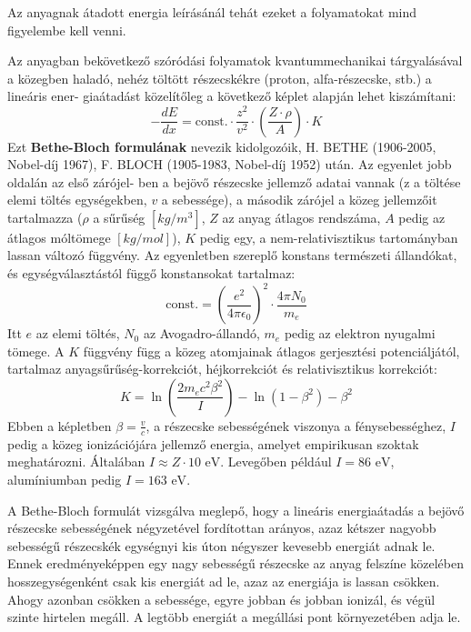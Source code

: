 \documentclass[../main.tex]{subfiles}
\begin{document}
Az anyagnak átadott energia leírásánál tehát ezeket a folyamatokat mind figyelembe
kell venni.

Az anyagban bekövetkező szóródási folyamatok kvantummechanikai tárgyalásával a
közegben haladó, nehéz töltött részecskékre (proton, alfa-részecske, stb.) a lineáris ener-
giaátadást közelítőleg a következő képlet alapján lehet kiszámítani:
\begin{equation}
    \boxed{-\frac{dE}{dx} = \text{const.} \cdot \frac{z^2}{v^2} \cdot \left(\frac{Z \cdot \rho}{A}\right) \cdot K}
\end{equation}
Ezt \textbf{Bethe-Bloch formulának} nevezik kidolgozóik, H. BETHE (1906-2005, Nobel-díj 1967),
F. BLOCH (1905-1983, Nobel-díj 1952) után. Az egyenlet jobb oldalán az első zárójel-
ben a bejövő részecske jellemző adatai vannak (z a töltése elemi töltés egységekben, $v$
a sebessége), a második zárójel a közeg jellemzőit tartalmazza ($\rho$ a sűrűség $[kg/m^3]$, $Z$ az
anyag átlagos rendszáma, $A$ pedig az átlagos móltömege
$[ kg/mol ]$), $K$ pedig egy, a nem-relativisztikus tartományban lassan változó függvény. Az egyenletben szereplő konstans
természeti állandókat, és egységválasztástól függő konstansokat tartalmaz:
\begin{equation}
    \text{const.} = \left(\frac{e^2}{4 \pi \epsilon_0}\right)^2 \cdot \frac{4 \pi N_0}{m_e}
\end{equation}
Itt $e$ az elemi töltés, $N_0$ az Avogadro-állandó, $m_e$ pedig az elektron nyugalmi tömege. A $K$ függvény függ a közeg atomjainak átlagos gerjesztési potenciáljától,
tartalmaz anyagsűrűség-korrekciót, héjkorrekciót és relativisztikus korrekciót:
\begin{equation}
    K = \ln \left(\frac{2 m_e c^2 \beta^2}{I}\right) - \ln(1 - \beta^2) - \beta^2
\end{equation}
Ebben a képletben $\beta = \frac{v}{c}$, a részecske sebességének viszonya a fénysebességhez, $I$ pedig a közeg ionizációjára jellemző energia, amelyet empirikusan szoktak meghatározni.
Általában $I \approx Z \cdot 10 \text{ eV}$. Levegőben például $I = 86 \text{ eV}$, alumíniumban pedig $I = 163 \text{ eV}$.

A Bethe-Bloch formulát vizsgálva meglepő, hogy a lineáris energiaátadás a bejövő
részecske sebességének négyzetével fordítottan arányos, azaz kétszer nagyobb sebességű
részecskék egységnyi kis úton négyszer kevesebb energiát adnak le. Ennek eredményeképpen egy nagy sebességű részecske az anyag felszíne közelében hosszegységenként csak
kis energiát ad le, azaz az energiája is lassan csökken. Ahogy azonban csökken a sebessége, egyre jobban és jobban ionizál, és végül szinte hirtelen megáll. A legtöbb energiát
a megállási pont környezetében adja le.
\end{document}
